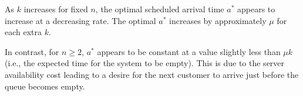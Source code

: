 As $k$ increases for fixed $n$, the optimal scheduled arrival time $a^{*}$ appears to increase at a decreasing rate. The optimal $a^{*}$ increases by approximately $\mu$ for each extra $k$.

In contrast, for $n \geq 2$, $a^{*}$ appears to be constant at a value slightly less than $\mu k$ (i.e., the expected time for the system to be empty). This is due to the server availability cost leading to a desire for the next customer to arrive just before the queue becomes empty.


































